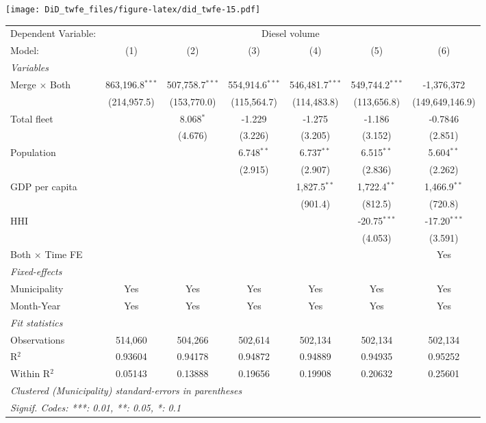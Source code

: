 \documentclass[
]{article}
\begin{document}
\texttt{[image: DiD\_twfe\_files/figure-latex/did\_twfe-15.pdf]}

\begin{tabular}{lcccccc}
\tabularnewline\midrule\midrule
Dependent Variable:&\multicolumn{6}{c}{Diesel volume}\\
Model:&(1) & (2) & (3) & (4) & (5) & (6)\\
\midrule \emph{Variables}&   &   &   &   &   &  \\
Merge $\times $ Both & 863,196.8$^{***}$ & 507,758.7$^{***}$ & 554,914.6$^{***}$ & 546,481.7$^{***}$ & 549,744.2$^{***}$ & -1,376,372\\
  &(214,957.5) & (153,770.0) & (115,564.7) & (114,483.8) & (113,656.8) & (149,649,146.9)\\
Total fleet &    & 8.068$^{*}$ & -1.229 & -1.275 & -1.186 & -0.7846\\
  &   & (4.676) & (3.226) & (3.205) & (3.152) & (2.851)\\
Population &    &    & 6.748$^{**}$ & 6.737$^{**}$ & 6.515$^{**}$ & 5.604$^{**}$\\
  &   &    & (2.915) & (2.907) & (2.836) & (2.262)\\
GDP per capita &    &    &    & 1,827.5$^{**}$ & 1,722.4$^{**}$ & 1,466.9$^{**}$\\
  &   &    &    & (901.4) & (812.5) & (720.8)\\
HHI &    &    &    &    & -20.75$^{***}$ & -17.20$^{***}$\\
  &   &    &    &    & (4.053) & (3.591)\\
Both $\times$ Time FE &  &  &  &  &  & Yes\\
\midrule \emph{Fixed-effects}&   &   &   &   &   &  \\
Municipality & Yes & Yes & Yes & Yes & Yes & Yes\\
Month-Year & Yes & Yes & Yes & Yes & Yes & Yes\\
\midrule \emph{Fit statistics}&  & & & & & \\
Observations & 514,060&504,266&502,614&502,134&502,134&502,134\\
R$^2$ & 0.93604&0.94178&0.94872&0.94889&0.94935&0.95252\\
Within R$^2$ & 0.05143&0.13888&0.19656&0.19908&0.20632&0.25601\\
\midrule\midrule\multicolumn{7}{l}{\emph{Clustered (Municipality) standard-errors in parentheses}}\\
\multicolumn{7}{l}{\emph{Signif. Codes: ***: 0.01, **: 0.05, *: 0.1}}\\
\end{tabular}
\end{document}
